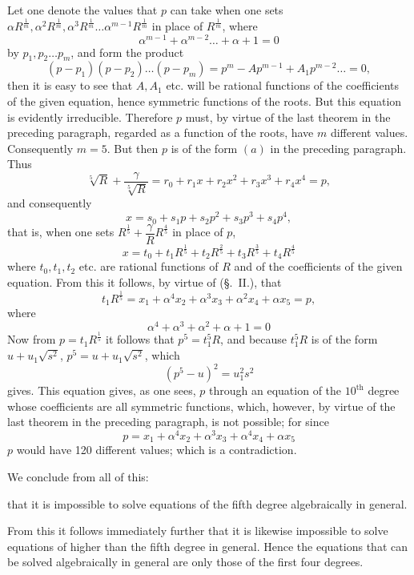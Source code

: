 \documentclass{article}
\begin{document}
Let one denote the values that $p$ can take when one sets $\alpha R^{\frac{1}{m}}, \alpha^{2} R^{\frac{1}{m}}, \alpha^{3} R^{\frac{1}{m}} \ldots \alpha^{m-1} R^{\frac{1}{m}}$ in place of $R^{\frac{1}{m}}$, where
\[ \alpha^{m-1} + \alpha^{m-2} \ldots + \alpha + 1 = 0 \]
by $p_1, p_2 \ldots p_m$, and form the product
\[ (p - p_1)(p - p_2) \ldots (p - p_m) = p^{m} - Ap^{m-1} + A_1 p^{m-2} \ldots = 0, \]
then it is easy to see that $A, A_1$ etc. will be rational functions of the coefficients of the given equation, hence symmetric functions of the roots. But this equation is evidently irreducible. Therefore $p$ must, by virtue of the last theorem in the preceding paragraph, regarded as a function of the roots, have $m$ different values. Consequently $m = 5$. But then $p$ is of the form $(a)$ in the preceding paragraph. Thus
\[ \sqrt[5]{R} + \frac{\gamma}{\sqrt[5]{R}} = r_0 + r_1 x + r_2 x^{2} + r_3 x^{3} + r_4 x^{4} = p, \]
and consequently
\[ x = s_0 + s_1 p + s_2 p^{2} + s_3 p^{3} + s_4 p^{4}, \]
that is, when one sets $R^{\frac{1}{5}} + \dfrac{\gamma}{R} R^{\frac{4}{5}}$ in place of $p$,
\[ x = t_0 + t_1 R^{\frac{1}{5}} + t_2 R^{\frac{2}{5}} + t_3 R^{\frac{3}{5}} + t_4 R^{\frac{4}{5}} \]
where $t_0, t_1, t_2$ etc. are rational functions of $R$ and of the coefficients of the given equation. From this it follows, by virtue of (§.~II.), that
\[ t_1 R^{\frac{1}{5}} = x_1 + \alpha^{4} x_2 + \alpha^{3} x_3 + \alpha^{2} x_4 + \alpha x_5 = p, \]
where
\[ \alpha^{4} + \alpha^{3} + \alpha^{2} + \alpha + 1 = 0 \]
Now from $p = t_1 R^{\frac{1}{5}}$ it follows that $p^{5} = t_1^{5} R$, and because $t_1^{5} R$ is of the form $u + u_1 \sqrt{s^{2}}$, $p^{5} = u + u_1 \sqrt{s^{2}}$, which
\[ (p^{5} - u)^{2} = u_1^{2} s^{2} \]
gives. This equation gives, as one sees, $p$ through an equation of the $10^{\text{th}}$ degree whose coefficients are all symmetric functions, which, however, by virtue of the last theorem in the preceding paragraph, is not possible; for since
\[ p = x_1 + \alpha^{4} x_2 + \alpha^{3} x_3 + \alpha^{4} x_4 + \alpha x_5 \]
$p$ would have 120 different values; which is a contradiction.

We conclude from all of this:

that it is impossible to solve equations of the fifth degree algebraically in general.

From this it follows immediately further that it is likewise impossible to solve equations of higher than the fifth degree in general. Hence the equations that can be solved algebraically in general are only those of the first four degrees.
\end{document}
